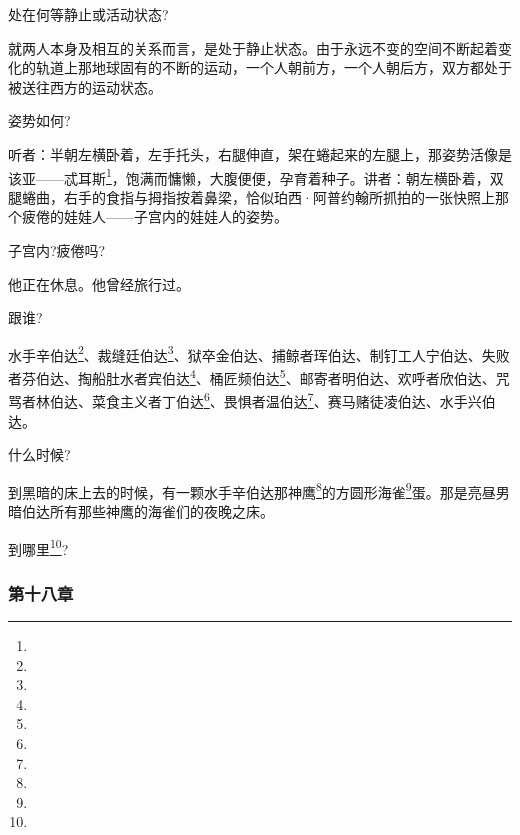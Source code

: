 \par 处在何等静止或活动状态?
\par 就两人本身及相互的关系而言，是处于静止状态。由于永远不变的空间不断起着变化的轨道上那地球固有的不断的运动，一个人朝前方，一个人朝后方，双方都处于被送往西方的运动状态。
\par 姿势如何?
\par 听者：半朝左横卧着，左手托头，右腿伸直，架在蜷起来的左腿上，那姿势活像是该亚——忒耳斯\footnote{}，饱满而慵懒，大腹便便，孕育着种子。讲者：朝左横卧着，双腿蜷曲，右手的食指与拇指按着鼻梁，恰似珀西·阿普约翰所抓拍的一张快照上那个疲倦的娃娃人——子宫内的娃娃人的姿势。
\par 子宫内?疲倦吗?
\par 他正在休息。他曾经旅行过。
\par 跟谁?
\par 水手辛伯达\footnote{}、裁缝廷伯达\footnote{}、狱卒金伯达、捕鲸者珲伯达、制钉工人宁伯达、失败者芬伯达、掏船肚水者宾伯达\footnote{}、桶匠频伯达\footnote{}、邮寄者明伯达、欢呼者欣伯达、咒骂者林伯达、菜食主义者丁伯达\footnote{}、畏惧者温伯达\footnote{}、赛马赌徒凌伯达、水手兴伯达。
\par 什么时候?
\par 到黑暗的床上去的时候，有一颗水手辛伯达那神鹰\footnote{}的方圆形海雀\footnote{}蛋。那是亮昼男暗伯达所有那些神鹰的海雀们的夜晚之床。
\par 到哪里\footnote{}?




















\subsubsection*{第十八章}


